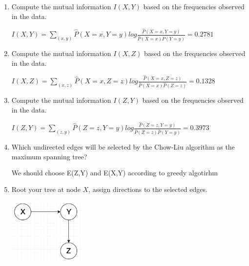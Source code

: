 \documentclass[a4paper]{article}
\theoremstyle{definition}
\newenvironment{soln}{
    \leavevmode\color{blue}\ignorespaces
}{}
\begin{document}
\begin{enumerate}
\item Compute the mutual information $I(X, Y)$ based on the frequencies observed in the data.

\begin{soln}

$I(X, Y) = \sum_{(x,y)}\hat{P}(X=x,Y=y)log\frac{\hat{P}(X=x,Y=y)}{\hat{P}(X=x)\hat{P}(Y=y)} = 0.2781$
\end{soln}

\item Compute the mutual information $I(X, Z)$ based on the frequencies observed in the data.
\begin{soln}

$I(X, Z) = \sum_{(x,z)}\hat{P}(X=x,Z=z)log\frac{\hat{P}(X=x,Z=z)}{\hat{P}(X=x)\hat{P}(Z=z)} = 0.1328$
\end{soln}
\item Compute the mutual information $I(Z, Y)$ based on the frequencies observed in the data.
\begin{soln}

$I(Z, Y) = \sum_{(z,y)}\hat{P}(Z=z,Y=y)log\frac{\hat{P}(Z=z,Y=y)}{\hat{P}(Z=z)\hat{P}(Y=y)} = 0.3973$
\end{soln}
\item Which undirected edges will be selected by the Chow-Liu algorithm as the maximum spanning tree?
\begin{soln}

We should choose E(Z,Y) and E(X,Y) according to greedy algotirhm
\end{soln}
\item Root your tree at node $X$, assign directions to the selected edges.
\begin{soln}
\begin{center}
\includegraphics[width=0.3\textwidth]{q25.png}
\end{center}
\end{soln}

\end{enumerate}
\end{document}
